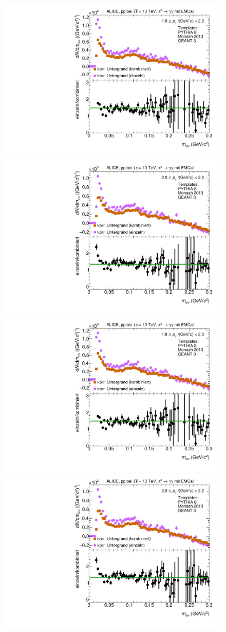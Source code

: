 \begin{figure}[t]
\begin{multicols}{2}
\end{multicols}
\begin{multicols}{2}
    \includegraphics[width=.65\linewidth]{Anhang/BackgroundWithRatio03_Data_2016.pdf}\par
    \includegraphics[width=.65\linewidth]{Anhang/BackgroundWithRatio04_Data_2016.pdf}\par
\end{multicols}
\begin{multicols}{2}
    \includegraphics[width=.65\linewidth]{Anhang/BackgroundWithRatio03_Data_2016.pdf}\par
    \includegraphics[width=.65\linewidth]{Anhang/BackgroundWithRatio04_Data_2016.pdf}\par
\end{multicols}
\end{figure}
\clearpage

